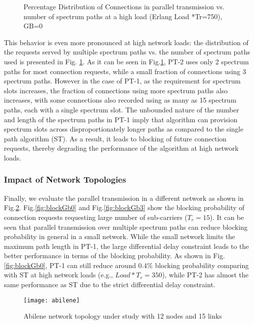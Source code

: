 \documentclass[conference]{IEEEtran}
\begin{document}
\begin{figure}
 \caption{Percentage Distribution of Connections in parallel transmission vs. number of spectrum paths at a high load (Erlang Load *Tr=750), GB=0  }\vspace{-0.2cm}
\label{resfigSPDist}
\end{figure}
 This behavior is even more pronounced at high network loads: the distribution of the requests served by multiple 
 spectrum paths vs. the number  of spectrum paths used is presented in Fig. \ref{resfigSPDist}. As it can be seen in Fig.\ref{resfigSPDist}, PT-2  uses only 2 spectrum paths for most connection requests, while a small fraction of 
 connections using 3 spectrum paths. However in the case of PT-1, as the requirement for spectrum slots increases, the 
 fraction of connections using more spectrum paths also increases, with some connections also recorded using as many 
 as 15  spectrum paths, each with a single spectrum slot.  The unbounded nature of the number and  length of the 
 spectrum paths in PT-1 imply that  algorithm can provision spectrum slots across disproportionately longer paths as 
 compared to the single path algorithm (ST). As a result, it leads to blocking of future connection requests, thereby 
 degrading the performance of the algorithm at high network loads.



 \subsubsection{Impact of Network Topologies}
  Finally, we evaluate the parallel transmission in a different network as shown in Fig.\ref{fig:abilene}. Fig.\ref{fig:blockGb0} and Fig.\ref{fig:blockGb3} show the blocking probability of connection requests requesting large number of sub-carriers ($T_r=15$). It can be seen that parallel transmission over multiple spectrum paths can reduce blocking probability in general in a small network. While the small network limits the maximum path length in PT-1, the large differential delay constraint leads to the better performance in terms of the blocking probability. As shown in Fig.\ref{fig:blockGb0}, PT-1 can still reduce around $0.4\%$ blocking probability comparing with ST at high network loads (e.g., $Load*T_r=350$), while PT-2 has almost the same performance as ST due to the strict differential delay constraint. 
   \begin{figure}
	\centering
	\texttt{[image: abilene]} 
  \caption{Abilene network topology \cite{SNDlib} under study with 12 nodes and 15 links} \label{fig:abilene} \vspace{-0.3cm}
 \end{figure} 
 
\end{document}
